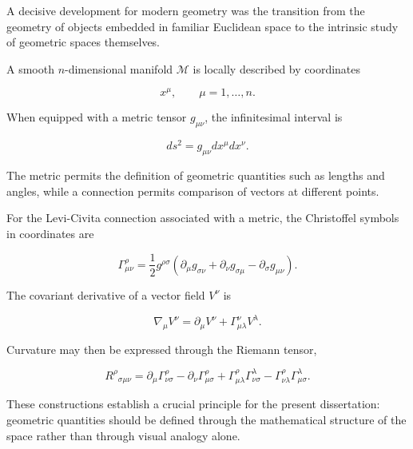 \documentclass[12pt,oneside]{book}
\begin{document}
A decisive development for modern geometry was the transition
from the geometry of objects embedded in familiar Euclidean
space to the intrinsic study of geometric spaces themselves.

A smooth \(n\)-dimensional manifold \(\mathcal{M}\) is locally
described by coordinates

\begin{equation}
    x^\mu,
    \qquad
    \mu = 1,\ldots,n.
\end{equation}

When equipped with a metric tensor \(g_{\mu\nu}\), the
infinitesimal interval is

\begin{equation}
    ds^2
    =
    g_{\mu\nu}
    dx^\mu dx^\nu.
    \label{eq:metric-line-element}
\end{equation}

The metric permits the definition of geometric quantities such
as lengths and angles, while a connection permits comparison of
vectors at different points.

For the Levi-Civita connection associated with a metric, the
Christoffel symbols in coordinates are

\begin{equation}
    \Gamma^{\rho}_{\mu\nu}
    =
    \frac{1}{2}
    g^{\rho\sigma}
    \left(
        \partial_\mu g_{\sigma\nu}
        +
        \partial_\nu g_{\sigma\mu}
        -
        \partial_\sigma g_{\mu\nu}
    \right).
    \label{eq:christoffel-symbols}
\end{equation}

The covariant derivative of a vector field \(V^\nu\) is

\begin{equation}
    \nabla_\mu V^\nu
    =
    \partial_\mu V^\nu
    +
    \Gamma^\nu_{\mu\lambda}
    V^\lambda.
    \label{eq:covariant-derivative}
\end{equation}

Curvature may then be expressed through the Riemann tensor,

\begin{equation}
    R^{\rho}{}_{\sigma\mu\nu}
    =
    \partial_\mu
    \Gamma^{\rho}_{\nu\sigma}
    -
    \partial_\nu
    \Gamma^{\rho}_{\mu\sigma}
    +
    \Gamma^{\rho}_{\mu\lambda}
    \Gamma^{\lambda}_{\nu\sigma}
    -
    \Gamma^{\rho}_{\nu\lambda}
    \Gamma^{\lambda}_{\mu\sigma}.
    \label{eq:riemann-tensor}
\end{equation}

These constructions establish a crucial principle for the
present dissertation: geometric quantities should be defined
through the mathematical structure of the space rather than
through visual analogy alone.
\end{document}
